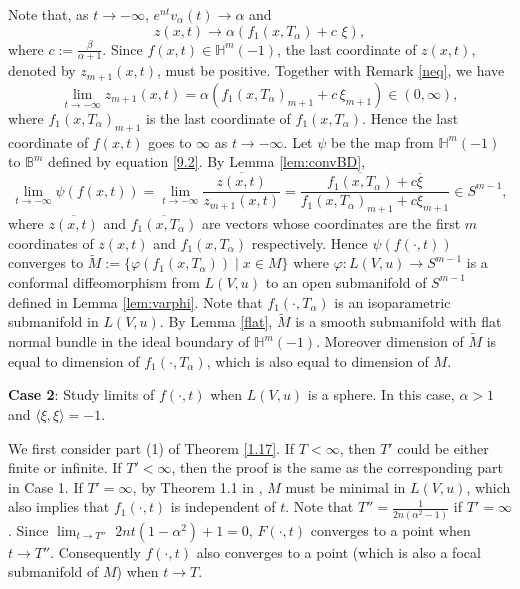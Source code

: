 \documentclass[12pt]{article}
\begin{document}
Note that, as $t \rightarrow -\infty$,  $e^{nt} v_\alpha(t) \rightarrow \alpha$  and
\[ z(x, t) \rightarrow \alpha \left( f_1(x,T_\alpha)
		  	      + c \,\, \xi \right), \]
where $c:= \frac{\beta}{\alpha+1}$.
Since $f(x, t) \in \mathbb{H}^{m}(-1)$, the last coordinate of $z(x, t)$, denoted by $z_{m+1}(x, t)$, must be positive. Together with Remark \ref{neq}, we have
\[ \lim_{t \rightarrow -\infty} z_{m+1}(x, t) =
      \alpha \left( f_1(x,T_\alpha)_{m+1} +c \, \xi_{m+1} \right) \in (0, \infty), \]
 where
$f_1(x,T_\alpha)_{m+1}$ is the last coordinate of $f_1(x,T_\alpha)$. Hence
the last coordinate of $f(x, t)$ goes to $\infty$ as  $t \rightarrow -\infty$.
Let $\psi$ be the map from $\mathbb{H}^{m}(-1)$ to $\mathbb{B}^m$ defined by equation \eqref{9.2}.
By Lemma \ref{lem:convBD},
\[ \lim_{t \rightarrow -\infty} \psi(f(x,t))
 =  \lim_{t \rightarrow -\infty} \frac{\overline{z(x,t)}}{z_{m+1}(x, t)}
    =  \frac{\overline{f_1(x,T_\alpha)} + c \overline{\xi}}{f_1(x, T_\alpha)_{m+1} + c \xi_{m+1}} \in S^{m-1}, \]
where $\overline{z(x,t)}$ and $\overline{f_1(x,T_\alpha)}$ are vectors whose coordinates are
the first $m$ coordinates of $z(x, t)$ and $f_1(x, T_\alpha)$ respectively.
Hence $\psi(f(\cdot, t))$ converges to $\widetilde{M} := \{\varphi(f_1(x, T_\alpha)) \mid x \in M \}$
where $\varphi: L(V, u) \longrightarrow S^{m-1}$ is a conformal diffeomorphism from
$L(V, u)$ to an open submanifold of $S^{m-1}$ defined in Lemma \ref{lem:varphi}.
Note that $f_1(\cdot, T_\alpha)$ is an isoparametric submanifold in $L(V,u)$.
By Lemma \ref{flat}, $\widetilde{M}$ is a smooth submanifold with flat normal bundle
in the ideal boundary of $\mathbb{H}^m(-1)$. Moreover dimension of $\widetilde{M}$
is equal to dimension of $f_1(\cdot, T_\alpha)$, which is also equal to dimension of $M$.

\vspace{6pt}

\textbf{Case 2}: Study limits of $f(\cdot, t)$ when $L(V,u)$ is a sphere.
In this case,   $ \alpha>1$ and $\langle\xi,\xi\rangle=-1$.

We first consider part (1) of Theorem \ref{1.17}. If $T < \infty$, then $T'$ could be either finite or infinite.
If $T' < \infty$, then the proof is the same as the corresponding part in Case 1.  If $T'=\infty$, by Theorem 1.1 in \cite{X.CT}, $M$ must be minimal in $L(V,u)$,
which also implies that $f_1(\cdot,t)$ is independent of $t$.
Note that  $T''= \frac{1}{2n(\alpha^2-1)}$ if $T'=\infty$.
Since $\lim_{t \rightarrow T''} \,\, 2nt(1-\alpha^2)+1 =0$, $F(\cdot, t)$ converges to a point when $t\rightarrow T''$.
Consequently  $f(\cdot, t)$ also converges to a point (which is also a focal submanifold of $M$) when $t\rightarrow T$.
\end{document}

